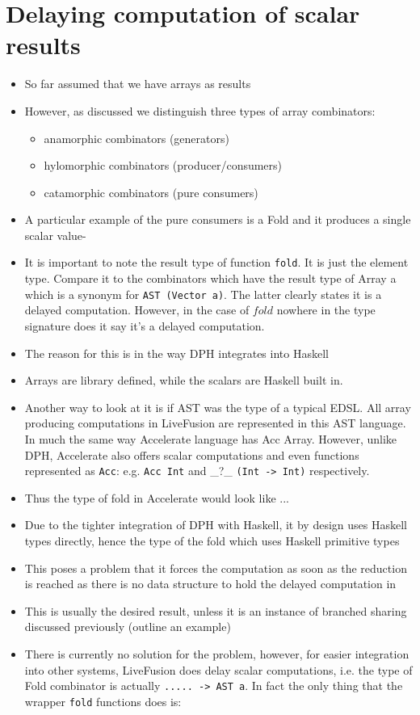 \documentclass[preamble.tex]{subfiles}
\begin{document}
\section{Delaying computation of scalar results}
\begin{itemize}
\item So far assumed that we have arrays as results
\item However, as discussed we distinguish three types of array combinators:
\begin{itemize}
  \item anamorphic combinators (generators)
  \item hylomorphic combinators (producer/consumers)
  \item catamorphic combinators (pure consumers)
\end{itemize}
\item A particular example of the pure consumers is a Fold and it produces a single scalar value- 
\item It is important to note the result type of function \texttt{fold}. It is just the element type. Compare it to the combinators which have the result type of Array a which is a synonym for \texttt{AST (Vector a)}. The latter clearly states it is a delayed computation. However, in the case of $fold$ nowhere in the type signature does it say it's a delayed computation.
\item The reason for this is in the way DPH integrates into Haskell
\item Arrays are library defined, while the scalars are Haskell built in.
\item Another way to look at it is if AST was the type of a typical EDSL. All array producing computations in LiveFusion are represented in this AST language. In much the same way Accelerate language has Acc Array. However, unlike DPH, Accelerate also offers scalar computations and even functions represented as \texttt{Acc}: e.g. \texttt{Acc Int} and \_?\_ \texttt{(Int -> Int)} respectively.
\item Thus the type of fold in Accelerate would look like ...
\item Due to the tighter integration of DPH with Haskell, it by design uses Haskell types directly, hence the type of the fold which uses Haskell primitive types
\item This poses a problem that it forces the computation as soon as the reduction is reached as there is no data structure to hold the delayed computation in
\item This is usually the desired result, unless it is an instance of branched sharing discussed previously (outline an example)
\item There is currently no solution for the problem, however, for easier integration into other systems, LiveFusion does delay scalar computations, i.e. the type of Fold combinator is actually \texttt{..... -> AST a}. In fact the only thing that the wrapper \texttt{fold} functions does is: 
\end{itemize}
\end{document}
